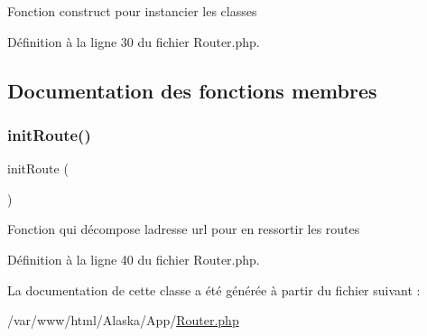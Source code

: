 Fonction construct pour instancier les classes 

Définition à la ligne 30 du fichier Router.\+php.



\subsection{Documentation des fonctions membres}
\mbox{\label{class_app_1_1_router_a6fa8800727e8e7eeab56d569bfa3429b}} 
\subsubsection{\texorpdfstring{init\+Route()}{initRoute()}}
{\footnotesize\ttfamily init\+Route (\begin{DoxyParamCaption}{ }\end{DoxyParamCaption})}

Fonction qui décompose l\textquotesingle{}adresse url pour en ressortir les routes 

Définition à la ligne 40 du fichier Router.\+php.



La documentation de cette classe a été générée à partir du fichier suivant \+:\begin{DoxyCompactItemize}
\item 
/var/www/html/\+Alaska/\+App/\hyperlink{_router_8php}{Router.\+php}\end{DoxyCompactItemize}
